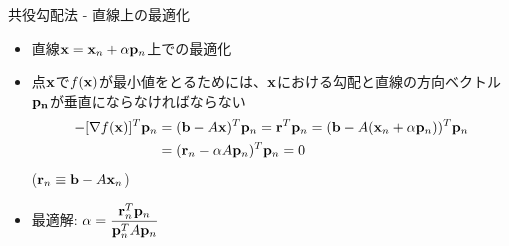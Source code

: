 \begin{frame}[t,fragile]{共役勾配法 - 直線上の最適化}
  \begin{itemize}
    \setlength{\itemsep}{1em}
  \item 直線${\bf x} = {\bf x}_n + \alpha {\bf p}_n$上での最適化
  \item 点${\bf x}$で$f({\bf x})$が最小値をとるためには、${\bf x}$における勾配と直線の方向ベクトル${\bf p_n}$が垂直にならなければならない
    \begin{align*}
      -[\nabla f({\bf x})]^T {\bf p}_n &= ({\bf b} - A {\bf x})^T {\bf p}_n = {\bf r}^T {\bf p}_n = ({\bf b} - A ({\bf x}_n+\alpha {\bf p}_n))^T {\bf p}_n \\ &= ({\bf r}_n - \alpha A {\bf p}_n)^T {\bf p}_n = 0
    \end{align*}
    (${\bf r}_n \equiv {\bf b} - A{\bf x}_ n$)
  \item 最適解: $\displaystyle \alpha = \frac{{\bf r}_n^T {\bf p}_n}{{\bf p}_n^T A {\bf p}_n}$
  \end{itemize}
\end{frame}
